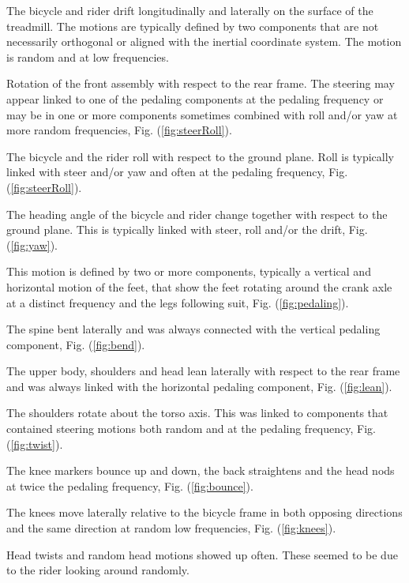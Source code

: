 \begin{description}[Pedaling]
    \item[Drift] The bicycle and rider drift longitudinally and laterally on the surface of the treadmill. The motions are typically defined by two components that are not necessarily orthogonal or aligned with the inertial coordinate system. The motion is random and at low frequencies.
    \item[Steer] Rotation of the front assembly with respect to the rear frame. The steering may appear linked to one of the pedaling components at the pedaling frequency or may be in one or more components sometimes combined with roll and/or yaw at more random frequencies, Fig. (\ref{fig:steerRoll}).
    \item[Roll] The bicycle and the rider roll with respect to the ground plane. Roll is typically linked with steer and/or yaw and often at the pedaling frequency, Fig. (\ref{fig:steerRoll}).
    \item[Yaw] The heading angle of the bicycle and rider change together with respect to the ground plane. This is typically linked with steer, roll and/or the drift, Fig. (\ref{fig:yaw}).
    \item[Pedaling] This motion is defined by two or more components, typically a vertical and horizontal motion of the feet, that show the feet rotating around the crank axle at a distinct frequency and the legs following suit, Fig. (\ref{fig:pedaling}).
    \item[Bend] The spine bent laterally and was always connected with the vertical pedaling component, Fig. (\ref{fig:bend}).
    \item[Lean] The upper body, shoulders and head lean laterally with respect to the rear frame and was always linked with the horizontal pedaling component, Fig. (\ref{fig:lean}).
    \item[Twist] The shoulders rotate about the torso axis. This was linked to components that contained steering motions both random and at the pedaling frequency, Fig. (\ref{fig:twist}).
    \item[Bounce] The knee markers bounce up and down, the back straightens and the head nods at twice the pedaling frequency, Fig. (\ref{fig:bounce}).
    \item[Knees] The knees move laterally relative to the bicycle frame in both opposing directions and the same direction at random low frequencies, Fig. (\ref{fig:knees}).
    \item[Head] Head twists and random head motions showed up often. These seemed to be due to the rider looking around randomly.
\end{description}
